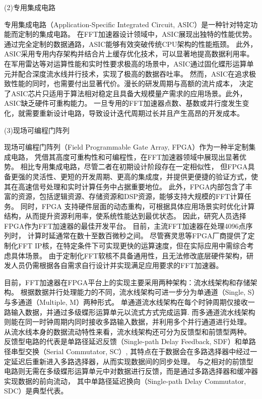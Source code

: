 (2)专用集成电路

专用集成电路（Application-Specific Integrated Circuit, ASIC）\cite{1020310501.nh}是一种针对特定功能而定制的集成电路。
在FFT加速器设计领域中，ASIC展现出独特的性能优势。
通过完全定制的数据通路，ASIC能够有效突破传统CPU架构的性能瓶颈。
此外，ASIC采用专用内存架构并结合片上缓存优化技术，可以显著地提高数据利用率。
在军用雷达等对运算性能和实时性要求极高的场景中，ASIC通过固化蝶形运算单元并配合深度流水线并行技术，实现了极高的数据吞吐率。
然而，ASIC在追求极致性能的同时，也需要付出显著代价。漫长的研发周期与高额的流片成本，
决定了ASIC芯片只适用于算法相对稳定且具备大规模量产需求的应用场景。此外，ASIC缺乏硬件可重构能力。
一旦专用的FFT加速器点数、基数或并行度发生变化，就需要重新设计电路，导致设计迭代周期过长并且产生高昂的开发成本。

(3)现场可编程门阵列

现场可编程门阵列（Field Programmable Gate Array, FPGA）作为一种半定制集成电路\cite{1023023424.nh}，
凭借其高度可重构性和可编程性，在FFT加速器领域中展现出显著优势。
相比专用集成电路，尽管二者在初期设计阶段存在一定相似性，
但FPGA具备更强的灵活性、更短的开发周期、更高的集成度，并提供更便捷的验证方式，使其在高速信号处理和实时计算任务中占据重要地位。
此外，FPGA内部包含了丰富的资源，包括逻辑资源、存储资源和DSP资源，能够支持大规模的FFT计算任务。
同时，FPGA 支持硬件层面的动态重构\cite{FJDN201707003}，可根据具体应用场景实时优化计算结构，从而提升资源利用率，使系统性能达到最优状态。
因此，研究人员选择FPGA作为FFT加速器的最佳开发平台。
目前，主流FFT加速器在处理4096点序列时，
计算时延通常在数十至数百微秒之间。
尽管赛灵思等FPGA厂商提供了定制化FFT IP核\cite{1020163719.nh}，在特定条件下可实现更快的运算速度，但在实际应用中需综合考虑具体场景。
由于定制化FFT软核不具备通用性，且无法修改底层硬件架构，研发人员仍需根据各自需求自行设计并实现满足应用要求的FFT加速器。


目前，FFT加速器在FPGA平台上的实现主要采用两种架构：流水线架构和存储架构。
根据数据并行处理能力的不同，流水线架构可进一步分为单通道（Single, S）与多通道（Multiple, M）两种形式。
单通道流水线架构在每个时钟周期仅接收一路输入数据，并通过多级蝶形运算单元以流式方式完成运算.
而多通道流水线架构则能在同一时钟周期内同时接收多路输入数据，并利用多个并行通道进行处理。
从流水线本身的数据流动特性来看，流水线架构还可分为反馈型和前馈型两种。
反馈型电路的代表是单路径延迟反馈（Single-path Delay Feedback, SDF）\cite{cortes2009radix}和单路径串型交换（Serial Commutator, SC）\cite{garrido2016serial},
其特点在于数据会在多路选择器中经过一定延迟后重新进入多路选择器，从而实现数据间的同步处理。
与之相对的前馈型电路则无需在多级蝶形运算单元中对数据进行反馈，而是通过多路选择器和缓冲器实现数据的前向流动，
其中单路径延迟换向（Single-path Delay Commutator, SDC）\cite{o1970nonrecursive}是典型代表。

